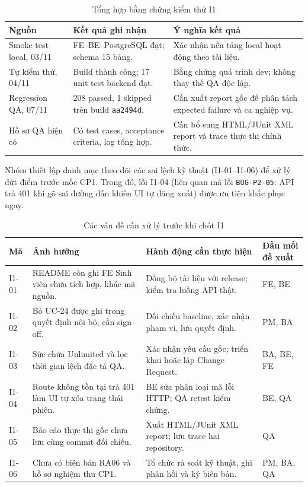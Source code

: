 \begin{table}[H]
\centering\small
\caption{Tổng hợp bằng chứng kiểm thử I1}\label{tab:i1-quality}
\begin{tabularx}{\linewidth}{@{}p{.24\linewidth}XX@{}}
\toprule
\textbf{Nguồn} & \textbf{Kết quả ghi nhận} & \textbf{Ý nghĩa kết quả}\\\midrule
Smoke test local, 03/11 & FE--BE--PostgreSQL đạt; schema 15 bảng. & Xác nhận nền tảng local hoạt động theo tài liệu.\\
Tự kiểm thử, 04/11 & Build thành công; 17 unit test backend đạt. & Bằng chứng quá trình dev; không thay thế QA độc lập.\\
Regression QA, 07/11 & 208 passed, 1 skipped trên build \texttt{aa2494d}. & Cần xuất report gốc để phân tách expected failure và ca nghiệp vụ.\\
Hồ sơ QA hiện có & Có test cases, acceptance criteria, log tổng hợp. & Cần bổ sung HTML/JUnit XML report và trace thực thi chính thức.\\
\bottomrule
\end{tabularx}
\end{table}


Nhóm thiết lập danh mục theo dõi các sai lệch kỹ thuật (I1-01--I1-06) để xử lý dứt điểm trước mốc CP1. Trong đó, lỗi I1-04 (liên quan mã lỗi \texttt{BUG-P2-05}: API trả 401 khi gõ sai đường dẫn khiến UI tự đăng xuất) được ưu tiên khắc phục ngay.

\begin{table}[H]
\centering\small
\caption{Các vấn đề cần xử lý trước khi chốt I1}\label{tab:i1-issues}
\begin{tabularx}{\linewidth}{@{}p{.08\linewidth}XXp{.13\linewidth}@{}}
\toprule
\textbf{Mã} & \textbf{Ảnh hưởng} & \textbf{Hành động cần thực hiện} & \textbf{Đầu mối đề xuất}\\\midrule
I1-01 & README còn ghi FE Sinh viên chưa tích hợp, khác mã nguồn. & Đồng bộ tài liệu với release; kiểm tra luồng API thật. & FE, BE\\
I1-02 & Bỏ UC-24 được ghi trong quyết định nội bộ; cần sign-off. & Đối chiếu baseline, xác nhận phạm vi, lưu quyết định. & PM, BA\\
I1-03 & Sức chứa Unlimited và lọc thời gian lệch đặc tả QA. & Xác nhận yêu cầu gốc; triển khai hoặc lập Change Request. & BA, BE, FE\\
I1-04 & Route không tồn tại trả 401 làm UI tự xóa trạng thái phiên. & BE sửa phân loại mã lỗi HTTP; QA retest kiểm chứng. & BE, QA\\
I1-05 & Báo cáo thực thi gốc chưa lưu cùng commit đối chiếu. & Xuất HTML/JUnit XML report; lưu trace hai repository. & QA\\
I1-06 & Chưa có biên bản RA06 và hồ sơ nghiệm thu CP1. & Tổ chức rà soát kỹ thuật, ghi phản hồi và ký biên bản. & PM, BA, QA\\
\bottomrule
\end{tabularx}
\end{table}

